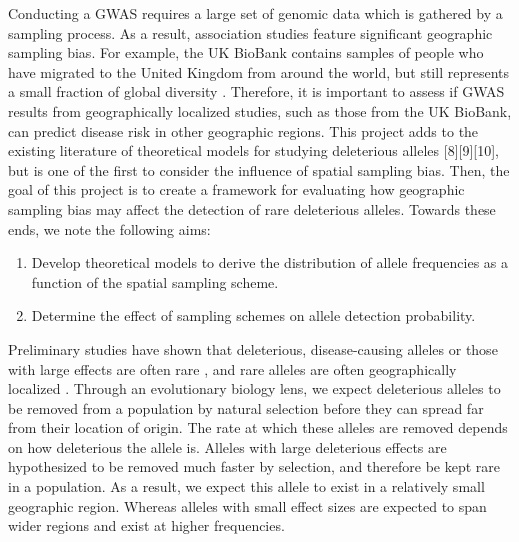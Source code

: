 Conducting a GWAS requires a large set of genomic data which is gathered by a sampling process. As a result, association studies feature significant geographic sampling bias. For example, the UK BioBank contains samples of people who have migrated to the United Kingdom from around the world, but still represents a small fraction of global diversity \cite{ukbiobank}. Therefore, it is important to assess if GWAS results from geographically localized studies, such as those from the UK BioBank, can predict disease risk in other geographic regions. This project adds to the existing literature of theoretical models for studying deleterious alleles [8][9][10], but is one of the first to consider the influence of spatial sampling bias. Then, the goal of this project is to create a framework for evaluating how geographic sampling bias may affect the detection of rare deleterious alleles. Towards these ends, we note the following aims:	

\begin{enumerate}
    \item Develop theoretical models to derive the distribution of allele frequencies as a function of the spatial sampling scheme.
    \item Determine the effect of sampling schemes on allele detection probability.
\end{enumerate}


Preliminary studies have shown that deleterious, disease-causing alleles or those with large effects are often rare \cite{marouli_rare_2017} \cite{slatkin_estimating_2000}, and rare alleles are often geographically localized \cite{visscher_r.._2019}\cite{slatkin_spatial_1978}. Through an evolutionary biology lens, we expect deleterious alleles to be removed from a population by natural selection before they can spread far from their location of origin. The rate at which these alleles are removed depends on how deleterious the allele is. Alleles with large deleterious effects are hypothesized to be removed much faster by selection, and therefore be kept rare in a population. As a result, we expect this allele to exist in a relatively small geographic region. Whereas alleles with small effect sizes are expected to span wider regions and exist at higher frequencies. 

